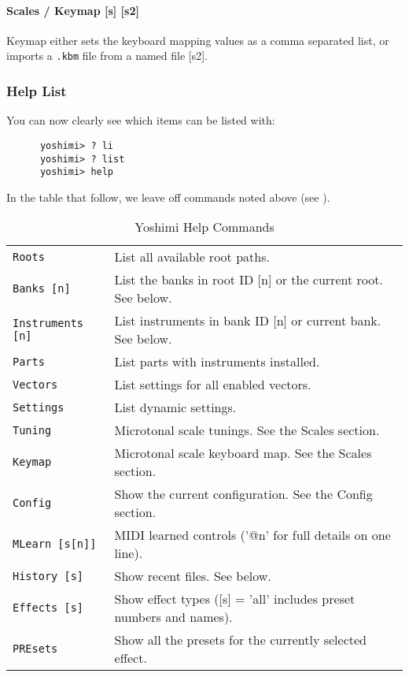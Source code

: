 \paragraph{Scales / Keymap [s] [s2]}
\label{paragraph:command_line_keymap}

   Keymap either sets the keyboard mapping values as a comma separated list, or
   imports a
   \texttt{.kbm} file from a named file [s2].

\subsubsection{Help List}
\label{subsec:command_line_help_list}

   You can now clearly see which items can be listed with:

   \begin{verbatim}
      yoshimi> ? li
      yoshimi> ? list
      yoshimi> help
   \end{verbatim}

   In the table that follow, we leave off commands noted above
   (see ).

   \begin{table}[H]
      \centering
      \caption{Yoshimi Help Commands}
      \label{table:yoshimi_text_help_commands}
      \begin{tabular}{l l}

\texttt{Roots} &
   List all available root paths. \\
\texttt{Banks [n]} &
   List the banks in root ID [n] or the current root.  See below. \\
\texttt{Instruments [n]} &
   List instruments in bank ID [n] or current bank. See below.  \\
\texttt{Parts} &
   List parts with instruments installed. \\
\texttt{Vectors} &
   List settings for all enabled vectors. \\
\texttt{Settings} &
   List dynamic settings. \\
\texttt{Tuning} &
   Microtonal scale tunings. See the Scales section. \\
\texttt{Keymap} &
   Microtonal scale keyboard map.  See the Scales section. \\
\texttt{Config} &
   Show the current configuration. See the Config section. \\
\texttt{MLearn [s[n]]} &
   MIDI learned controls ('@n' for full details on one line). \\
\texttt{History [s]} &
   Show recent files. See below. \\
\texttt{Effects [s]} &
   Show effect types ([s] = 'all' includes preset numbers and names). \\
\texttt{PREsets} &
   Show all the presets for the currently selected effect. \\

      \end{tabular}
   \end{table}

